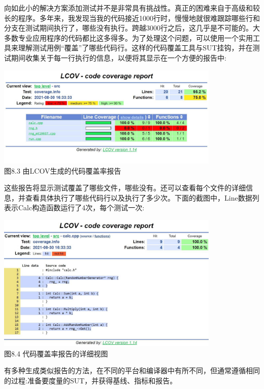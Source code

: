 

向如此小的解决方案添加测试并不是非常具有挑战性。真正的困难来自于高级和较长的程序。多年来，我发现当我的代码接近1000行时，慢慢地就很难跟踪哪些行和分支在测试期间执行了，哪些没有执行。跨越3000行之后，这几乎是不可能的。大多数专业应用程序的代码都比这多得多。为了处理这个问题，可以使用一个实用工具来理解测试用例“覆盖”了哪些代码行。这样的代码覆盖工具与SUT挂钩，并在测试期间收集关于每一行执行的信息，以便将其显示在一个方便的报告中:

\begin{center}
\includegraphics[width=0.8\textwidth]{content/3/chapter8/images/3.jpg}\\
图8.3 由LCOV生成的代码覆盖率报告
\end{center}

这些报告将显示测试覆盖了哪些文件，哪些没有。还可以查看每个文件的详细信息，并查看具体执行了哪些代码行以及执行了多少次。下面的截图中，Line数据列表示Calc构造函数运行了4次，每个测试一次:

\begin{center}
\includegraphics[width=0.8\textwidth]{content/3/chapter8/images/4.jpg}\\
图8.4 代码覆盖率报告的详细视图
\end{center}

有多种生成类似报告的方法，在不同的平台和编译器中有所不同，但通常遵循相同的过程:准备要度量的SUT，并获得基线、指标和报告。


